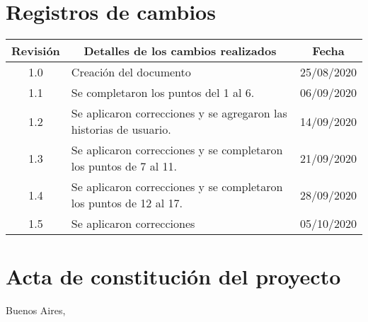 \documentclass[11pt]{charter}
\begin{document}
\maketitle
\thispagestyle{empty}
\pagebreak


\thispagestyle{empty}
{\setlength{\parskip}{0pt}
\tableofcontents{}
}
\pagebreak


\section{Registros de cambios}
\label{sec:registro}


\begin{table}[ht]
\label{tab:registro}
\centering
\begin{tabularx}{\linewidth}{@{}|c|X|c|@{}}
\hline
\rowcolor[HTML]{C0C0C0} 
Revisión & \multicolumn{1}{c|}{\cellcolor[HTML]{C0C0C0}Detalles de los cambios realizados} & Fecha      \\ \hline
1.0      & Creación del documento                                          & 25/08/2020 \\ \hline
1.1      & Se completaron los puntos del 1 al 6.                                                                 & 06/09/2020 \\ \hline
1.2      & Se aplicaron correcciones y se agregaron las historias de usuario. & 14/09/2020 \\ \hline
1.3      & Se aplicaron correcciones y se completaron los puntos de 7 al 11.                                                 & 21/09/2020 \\ \hline
1.4      & Se aplicaron correcciones y se completaron los puntos de 12 al 17.                                                 & 28/09/2020 \\ \hline
1.5      & Se aplicaron correcciones & 05/10/2020 \\ \hline
\end{tabularx}
\end{table}

\pagebreak



\section{Acta de constitución del proyecto}
\label{sec:acta}

\begin{flushright}
Buenos Aires, \fechaInicioName
\end{flushright}
\end{document}
